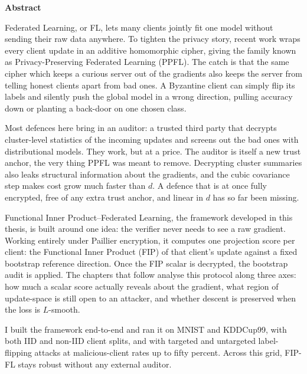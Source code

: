 \thispagestyle{plain}
\begin{center}
	\textbf{\Large Abstract}
\end{center}

\begingroup
\onehalfspacing
\setlength{\parskip}{6pt}

Federated Learning, or FL, lets many clients jointly fit one model without sending their raw data anywhere. To tighten the privacy story, recent work wraps every client update in an additive homomorphic cipher, giving the family known as Privacy-Preserving Federated Learning (PPFL). The catch is that the same cipher which keeps a curious server out of the gradients also keeps the server from telling honest clients apart from bad ones. A Byzantine client can simply flip its labels and silently push the global model in a wrong direction, pulling accuracy down or planting a back-door on one chosen class.

Most defences here bring in an auditor: a trusted third party that decrypts cluster-level statistics of the incoming updates and screens out the bad ones with distributional models. They work, but at a price. The auditor is itself a new trust anchor, the very thing PPFL was meant to remove. Decrypting cluster summaries also leaks structural information about the gradients, and the cubic covariance step makes cost grow much faster than $d$. A defence that is at once fully encrypted, free of any extra trust anchor, and linear in $d$ has so far been missing.

Functional Inner Product--Federated Learning, the framework developed in this thesis, is built around one idea: the verifier never needs to see a raw gradient. Working entirely under Paillier encryption, it computes one projection score per client: the Functional Inner Product (FIP) of that client's update against a fixed bootstrap reference direction. Once the FIP scalar is decrypted, the bootstrap audit is applied. The chapters that follow analyse this protocol along three axes: how much a scalar score actually reveals about the gradient, what region of update-space is still open to an attacker, and whether descent is preserved when the loss is $L$-smooth.

I built the framework end-to-end and ran it on MNIST and KDDCup99, with both IID and non-IID client splits, and with targeted and untargeted label-flipping attacks at malicious-client rates up to fifty percent. Across this grid, FIP-FL stays robust without any external auditor.

\endgroup

\newpage
\thispagestyle{empty}
\cleardoublepage
